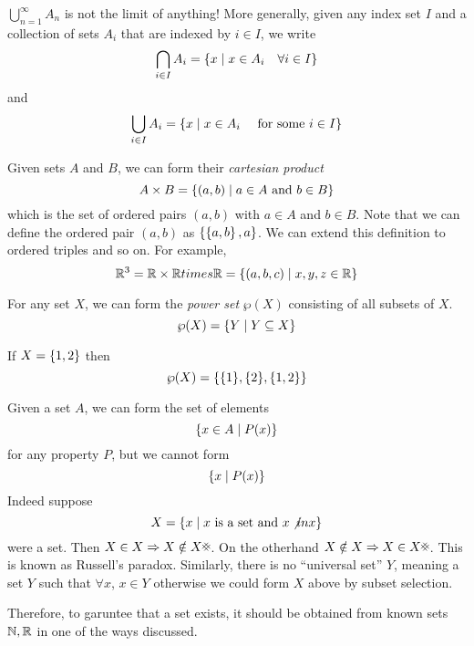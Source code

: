 \documentclass{article}
\begin{document}
\begin{warning}
    $\bigcup_{n=1}^\infty A_n$ is not the limit of anything!
    More generally, given any index set $I$ and a collection of sets $A_i$ that are indexed by $i \in I$, we write
    \[
        \bigcap_{i \in I} A_i = \left\{ x \mid x \in A_i \quad \forall i \in I \right\}
    \]
    and
    \[
        \bigcup_{i \in I} A_i = \left\{ x \mid x \in A_i \quad \text{ for some } i \in I \right\}
    \]
\end{warning}

\begin{defi}
    Given sets $A$ and $B$, we can form their \emph{cartesian product}
    \[
        A \times B = \left\{ (a, b) \mid a \in A \text{ and } b \in B \right\}  
    \]
    which is the set of ordered pairs $(a, b)$ with $a \in A$ and $b \in B$.
    Note that we can define the ordered pair $(a, b)$ as $\left\{ \left\{ a, b \right\}, a \right\}$.
    We can extend this definition to ordered triples and so on. For example,
    \[
        \mathbb{R}^3 = \mathbb{R} \times \mathbb{R} times \mathbb{R} = \left\{ (a, b, c) \mid x, y, z \in \mathbb{R} \right\}
    \]
\end{defi}


\begin{defi}
    For any set $X$, we can form the \emph{power set} $\wp(X)$ consisting of all subsets of $X$.
    \[
        \wp(X) = \left\{ Y \mid Y \subseteq X \right\}
    \]
\end{defi}
\begin{eg}
    If $X = \left\{ 1, 2 \right\}$ then
    \[
        \wp(X) = \left\{ \{1\}, \{2\}, \{1, 2\} \right\}  
    \]
\end{eg}
\begin{warning}
    Given a set $A$, we can form the set of elements
    \[
        \left\{ x \in A \mid P(x) \right\}  
    \]
    for any property $P$, but we cannot form
    \[
        \left\{ x \mid P(x) \right\}  
    \]
    Indeed suppose
    \[
        X = \left\{ x \mid x \text{ is a set and } x \not in x \right\}  
    \]
    were a set.
    Then $X \in X \Rightarrow X \notin X \contradiction$.
    On the otherhand $X \notin X \Rightarrow X \in X \contradiction$.
    This is known as Russell's paradox. 
    Similarly, there is no ``universal set'' $Y$, meaning a set $Y$ such that $\forall x$, $x \in Y$
    otherwise we could form $X$ above by subset selection.

    Therefore, to garuntee that a set exists, it should be obtained from known sets $\mathbb{N}, \mathbb{R}$ in one of the ways discussed.
\end{warning}
\end{document}
